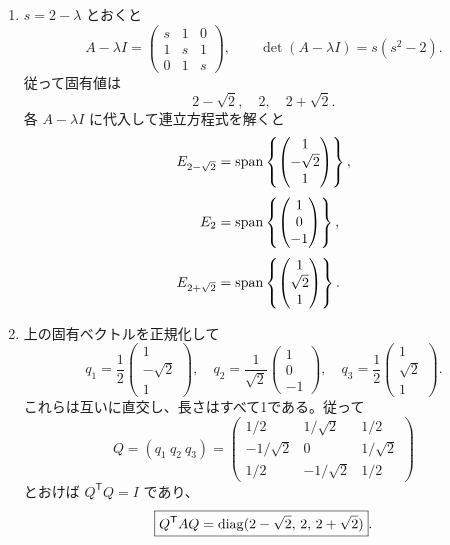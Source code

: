 \begin{enumerate}
  \item \(s=2-\lambda\) とおくと
  \[
  A-\lambda I=
  \begin{pmatrix}
  s&1&0\\
  1&s&1\\
  0&1&s
  \end{pmatrix},
  \qquad
  \det(A-\lambda I)=s(s^2-2).
  \]
  従って固有値は
  \[
  \boxed{2-\sqrt2,\quad 2,\quad 2+\sqrt2}.
  \]
  各 \(A-\lambda I\) に代入して連立方程式を解くと
  \[
  \begin{aligned}
  E_{2-\sqrt2}
  &=\operatorname{span}\left\{\begin{pmatrix}1\\-\sqrt2\\1\end{pmatrix}\right\},\\[1mm]
  E_2
  &=\operatorname{span}\left\{\begin{pmatrix}1\\0\\-1\end{pmatrix}\right\},\\[1mm]
  E_{2+\sqrt2}
  &=\operatorname{span}\left\{\begin{pmatrix}1\\\sqrt2\\1\end{pmatrix}\right\}.
  \end{aligned}
  \]

  \item 上の固有ベクトルを正規化して
  \[
  q_1=\frac12\begin{pmatrix}1\\-\sqrt2\\1\end{pmatrix},
  \quad
  q_2=\frac1{\sqrt2}\begin{pmatrix}1\\0\\-1\end{pmatrix},
  \quad
  q_3=\frac12\begin{pmatrix}1\\\sqrt2\\1\end{pmatrix}.
  \]
  これらは互いに直交し、長さはすべて1である。従って
  \[
  Q=(q_1\ q_2\ q_3)
  =\begin{pmatrix}
  1/2&1/\sqrt2&1/2\\
  -1/\sqrt2&0&1/\sqrt2\\
  1/2&-1/\sqrt2&1/2
  \end{pmatrix}
  \]
  とおけば \(Q^{\mathsf T}Q=I\) であり、
  \[
  \boxed{Q^{\mathsf T}AQ
  =\operatorname{diag}(2-\sqrt2,\,2,\,2+\sqrt2)}.
  \]


\end{enumerate}
